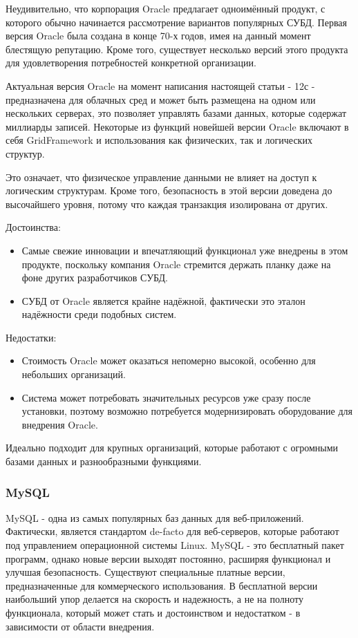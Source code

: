 Неудивительно, что корпорация Oracle предлагает одноимённый продукт, с которого обычно начинается рассмотрение вариантов популярных СУБД. Первая версия Oracle была создана в конце 70-х годов, имея на данный момент блестящую репутацию. Кроме того, существует несколько версий этого продукта для удовлетворения потребностей конкретной организации.

Актуальная версия Oracle на момент написания настоящей статьи - 12с - предназначена для облачных сред и может быть размещена на одном или нескольких серверах, это позволяет управлять базами данных, которые содержат миллиарды записей. Некоторые из функций новейшей версии Oracle включают в себя GridFramework и использования как физических, так и логических структур.

Это означает, что физическое управление данными не влияет на доступ к логическим структурам. Кроме того, безопасность в этой версии доведена до высочайшего уровня, потому что каждая транзакция изолирована от других.

Достоинства:

\begin{itemize}
\item Самые свежие инновации и впечатляющий функционал уже внедрены в этом продукте, поскольку компания Oracle стремится держать планку даже на фоне других разработчиков СУБД.
\item СУБД от Oracle является крайне надёжной, фактически это эталон надёжности среди подобных систем.
\end{itemize}

Недостатки:
\begin{itemize}
	\item Стоимость Oracle может оказаться непомерно высокой, особенно для небольших организаций.
	\item Система может потребовать значительных ресурсов уже сразу после установки, поэтому возможно потребуется модернизировать оборудование для внедрения Oracle.
\end{itemize}

Идеально подходит для крупных организаций, которые работают с огромными базами данных и разнообразными функциями.

\subsubsection{MySQL}

MySQL - одна из самых популярных баз данных для веб-приложений. Фактически, является стандартом de-facto для веб-серверов, которые работают под управлением операционной системы Linux. MySQL - это бесплатный пакет программ, однако новые версии выходят постоянно, расширяя функционал и улучшая безопасность. Существуют специальные платные версии, предназначенные для коммерческого использования. В бесплатной версии наибольший упор делается на скорость и надежность, а не на полноту функционала, который может стать и достоинством и недостатком - в зависимости от области внедрения.

